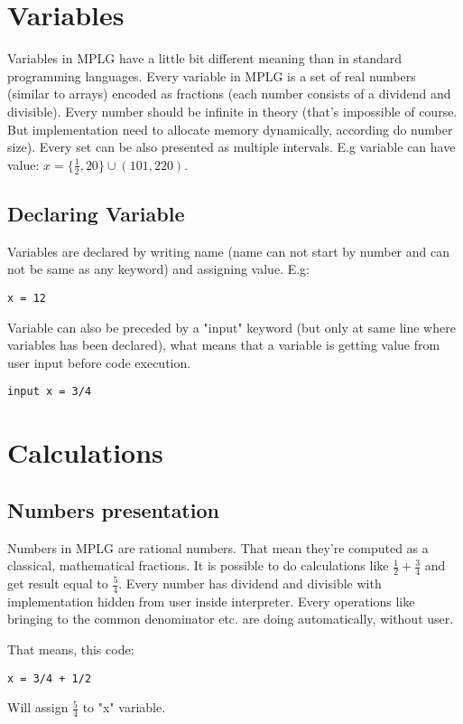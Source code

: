 \documentclass[a4paper]{report}
\begin{document}
\section{Variables}
Variables in MPLG have a little bit different meaning than in standard programming languages. Every variable in MPLG is a set of real numbers (similar to arrays) encoded as fractions (each number consists of a dividend and divisible). Every number should be infinite in theory (that's impossible of course. But implementation need to allocate memory dynamically, according do number size). Every set can be also presented as multiple intervals. E.g variable can have value: $x = \{\frac{1}{2}, 20\} \cup (101, 220)$.

\subsection{Declaring Variable}
Variables are declared by writing name (name can not start by number and can not be same as any keyword) and assigning value. E.g:
\begin{lstlisting}
x = 12
\end{lstlisting}
Variable can also be preceded by a "input" keyword (but only at same line where variables has been declared), what means that a variable is getting value from user input before code execution.
\begin{lstlisting}
input x = 3/4
\end{lstlisting}

\section{Calculations}
\subsection{Numbers presentation}
Numbers in MPLG are rational numbers. That mean they're computed as a classical, mathematical fractions. It is possible to do calculations like $\frac{1}{2} + \frac{3}{4}$ and get result equal to $\frac{5}{4}$. Every number has dividend and divisible with implementation hidden from user inside interpreter. Every operations like 
bringing to the common denominator etc. are doing automatically, without user.

That means, this code:
\begin{lstlisting}
x = 3/4 + 1/2
\end{lstlisting}
Will assign $\frac{5}{4}$ to "x" variable.
\end{document}
